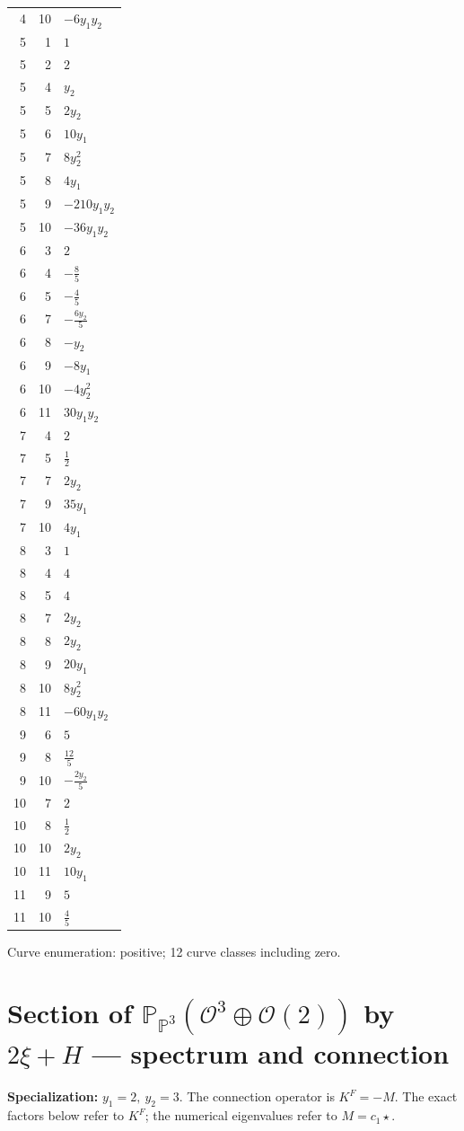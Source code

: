 \documentclass[10pt,a4paper]{article}
\begin{document}
{\begin{longtable}{rrp{125mm}}
4 & 10 & $- 6 y_{1} y_{2}$\\
5 & 1 & $1$\\
5 & 2 & $2$\\
5 & 4 & $y_{2}$\\
5 & 5 & $2 y_{2}$\\
5 & 6 & $10 y_{1}$\\
5 & 7 & $8 y_{2}^{2}$\\
5 & 8 & $4 y_{1}$\\
5 & 9 & $- 210 y_{1} y_{2}$\\
5 & 10 & $- 36 y_{1} y_{2}$\\
6 & 3 & $2$\\
6 & 4 & $- \frac{8}{5}$\\
6 & 5 & $- \frac{4}{5}$\\
6 & 7 & $- \frac{6 y_{2}}{5}$\\
6 & 8 & $- y_{2}$\\
6 & 9 & $- 8 y_{1}$\\
6 & 10 & $- 4 y_{2}^{2}$\\
6 & 11 & $30 y_{1} y_{2}$\\
7 & 4 & $2$\\
7 & 5 & $\frac{1}{2}$\\
7 & 7 & $2 y_{2}$\\
7 & 9 & $35 y_{1}$\\
7 & 10 & $4 y_{1}$\\
8 & 3 & $1$\\
8 & 4 & $4$\\
8 & 5 & $4$\\
8 & 7 & $2 y_{2}$\\
8 & 8 & $2 y_{2}$\\
8 & 9 & $20 y_{1}$\\
8 & 10 & $8 y_{2}^{2}$\\
8 & 11 & $- 60 y_{1} y_{2}$\\
9 & 6 & $5$\\
9 & 8 & $\frac{12}{5}$\\
9 & 10 & $- \frac{2 y_{2}}{5}$\\
10 & 7 & $2$\\
10 & 8 & $\frac{1}{2}$\\
10 & 10 & $2 y_{2}$\\
10 & 11 & $10 y_{1}$\\
11 & 9 & $5$\\
11 & 10 & $\frac{4}{5}$\\
\end{longtable}}
Curve enumeration: positive; 12 curve classes including zero.
\clearpage\section*{Section of $\mathbb P_{\mathbb P^{3}}(\mathcal O^{3}\oplus \mathcal O(2))$ by $2\xi +H$ --- spectrum and connection}
\textbf{Specialization:} $y_1=2,\ y_2=3$. The connection operator is $K^F=-M$. The exact factors below refer to $K^F$; the numerical eigenvalues refer to $M=c_1\star$.
\end{document}
